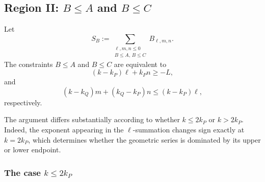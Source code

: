 \documentclass[10pt]{amsart}
\numberwithin{equation}{section}
\theoremstyle{definition}
\theoremstyle{remark}
\theoremstyle{remark}
\begin{document}
	\subsection{Region II: $B\le A$ and $B\le C$}
	
	Let
	\[
	S_B:=\sum_{\substack{\ell,m,n\le0\\ B\le A,\,B\le C}}B_{\ell,m,n}.
	\]
	The constraints $B\le A$ and $B\le C$ are equivalent to
	\begin{equation}\label{eq:BA_app}
		(k-k_P)\ell+k_P n\ge -L,
	\end{equation}
	and
	\begin{equation}\label{eq:BC_app}
		(k-k_Q)m+(k_Q-k_P)n\le (k-k_P)\ell,
	\end{equation}
	respectively.
    
	The argument differs substantially according to whether $k\le 2k_P$ or $k>2k_P$.
    Indeed, the exponent appearing in the $\ell$-summation changes sign exactly at
    $k=2k_P$,
    which determines whether the geometric series is dominated by its upper or lower endpoint.
    
	\subsubsection{The case $k\le 2k_P$}
	
\end{document}
